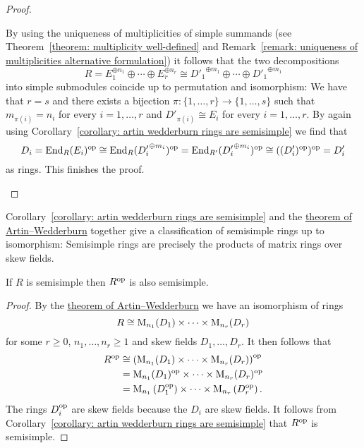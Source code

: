 \begin{proof}
\begin{enumerate}
      By using the uniqueness of multiplicities of simple summands (see Theorem~\ref{theorem: multiplicity well-defined} and Remark~\ref{remark: uniqueness of multiplicities alternative formulation}) it follows that the two decompositions
      \[
              R
        =     E_1^{\oplus n_1} \oplus \dotsb \oplus E_r^{\oplus n_r}
        \cong {D'_1}^{\oplus m_1} \oplus \dotsb \oplus {D'_1}^{\oplus m_1}
      \]
      into simple submodules coincide up to permutation and isomorphism:
      We have that $r = s$ and there exists a bijection $\pi \colon \{1, \dotsc, r\} \to \{1, \dotsc, s\}$ such that $m_{\pi(i)} = n_i$ for every $i = 1, \dotsc, r$ and $D'_{\pi(i)} \cong E_i$ for every $i = 1, \dotsc, r$.
      By again using Corollary~\ref{corollary: artin wedderburn rings are semisimple} we find that
      \[
              D_i
        =     \operatorname{End}_R(E_i)^{\operatorname{op}}
        \cong \operatorname{End}_R({D'_i}^{\oplus m_i})^{\operatorname{op}}
        =     \operatorname{End}_{R'}({D'_i}^{\oplus m_i})^{\operatorname{op}}
        \cong ((D'_i)^{\operatorname{op}})^{\operatorname{op}}
        =     D'_i
      \]
      as rings.
      This finishes the proof.
    \qedhere
  \end{enumerate}
\end{proof}


\begin{remark}
  Corollary~\ref{corollary: artin wedderburn rings are semisimple} and the \hyperref[theorem: artin wedderburn theorem]{theorem of Artin--Wedderburn} together give a classification of semisimple rings up to isomorphism:
  Semisimple rings are precisely the products of matrix rings over skew fields.
\end{remark}


\begin{corollary}
  If $R$ is semisimple then $R^{\operatorname{op}}$ is also semisimple.
\end{corollary}


\begin{proof}
  By the \hyperref[theorem: artin wedderburn theorem]{theorem of Artin--Wedderburn} we have an isomorphism of rings
  \[
          R
    \cong \operatorname{M}_{n_1}(D_1) \times \dotsm \times \operatorname{M}_{n_r}(D_r)
  \]
  for some $r \geq 0$, $n_1, \dotsc, n_r \geq 1$ and skew fields $D_1, \dotsc, D_r$.
  It then follows that
  \begin{align*}
            R^{\operatorname{op}}
    &\cong  \left( \operatorname{M}_{n_1}(D_1) \times \dotsm \times \operatorname{M}_{n_r}(D_r) \right)^{\operatorname{op}} \\
    &=      \operatorname{M}_{n_1}(D_1)^{\operatorname{op}} \times \dotsm \times \operatorname{M}_{n_r}(D_r)^{\operatorname{op}} \\
    &=      \operatorname{M}_{n_1}\left( D_1^{\operatorname{op}} \right) \times \dotsm \times \operatorname{M}_{n_r}\left( D_r^{\operatorname{op}} \right).
  \end{align*}
  The rings $D_i^{\operatorname{op}}$ are skew fields because the $D_i$ are skew fields.
  It follows from Corollary~\ref{corollary: artin wedderburn rings are semisimple} that $R^{\operatorname{op}}$ is semisimple.
\end{proof}



